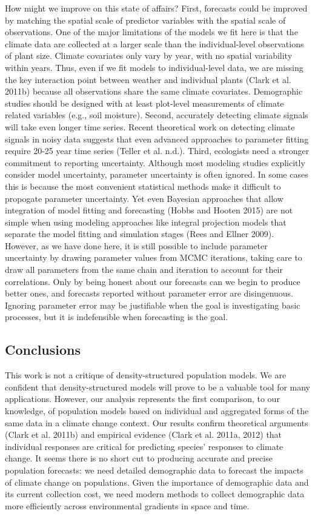 \documentclass[12pt,]{article}
\begin{document}
How might we improve on this state of affairs? First, forecasts could be
improved by matching the spatial scale of predictor variables with the
spatial scale of observations. One of the major limitations of the
models we fit here is that the climate data are collected at a larger
scale than the individual-level observations of plant size. Climate
covariates only vary by year, with no spatial variability within years.
Thus, even if we fit models to individual-level data, we are missing the
key interaction point between weather and individual plants (Clark et
al. 2011b) because all observations share the same climate covariates.
Demographic studies should be designed with at least plot-level
measurements of climate related variables (e.g., soil moisture). Second,
accurately detecting climate signals will take even longer time series.
Recent theoretical work on detecting climate signals in noisy data
suggests that even advanced approaches to parameter fitting require
20-25 year time series (Teller et al. n.d.). Third, ecologists need a
stronger commitment to reporting uncertainty. Although most modeling
studies explicitly consider model uncertainty, parameter uncertainty is
often ignored. In some cases this is because the most convenient
statistical methods make it difficult to propogate parameter
uncertainty. Yet even Bayesian approaches that allow integration of
model fitting and forecasting (Hobbs and Hooten 2015) are not simple
when using modeling approaches like integral projection models that
separate the model fitting and simulation stages (Rees and Ellner 2009).
However, as we have done here, it is still possible to include parameter
uncertainty by drawing parameter values from MCMC iterations, taking
care to draw all parameters from the same chain and iteration to account
for their correlations. Only by being honest about our forecasts can we
begin to produce better ones, and forecasts reported without parameter
error are disingenuous. Ignoring parameter error may be justifiable when
the goal is investigating basic processes, but it is indefensible when
forecasting is the goal.

\subsection{Conclusions}\label{conclusions}

This work is not a critique of density-structured population models. We
are confident that density-structured models will prove to be a valuable
tool for many applications. However, our analysis represents the first
comparison, to our knowledge, of population models based on individual
and aggregated forms of the same data in a climate change context. Our
results confirm theoretical arguments (Clark et al. 2011b) and empirical
evidence (Clark et al. 2011a, 2012) that individual responses are
critical for predicting species' responses to climate change. It seems
there is no short cut to producing accurate and precise population
forecasts: we need detailed demographic data to forecast the impacts of
climate change on populations. Given the importance of demographic data
and its current collection cost, we need modern methods to collect
demographic data more efficiently across environmental gradients in
space and time.
\end{document}
